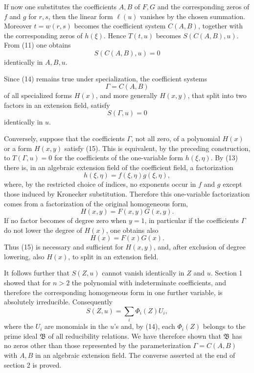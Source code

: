 \documentclass[11pt]{article}
\begin{document}
If now one substitutes the coefficients $A,B$ of $F,G$ and the corresponding zeros of $f$ and $g$ for $r,s$, then the linear form $\ell(u)$ vanishes by the chosen summation. Moreover $t=w(r,s)$ becomes the coefficient system $C(A,B)$, together with the corresponding zeros of $h(\xi)$. Hence $T(t,u)$ becomes $S(C(A,B),u)$. From (11) one obtains
\begin{equation}
  S(C(A,B),u)=0                                                   \tag{14}
\end{equation}
identically in $A,B,u$.

Since (14) remains true under specialization, the coefficient systems
\[
  \Gamma=C(A,B)
\]
of all specialized forms $H(x)$, and more generally $H(x,y)$, that split into two factors in an extension field, satisfy
\begin{equation}
  S(\Gamma,u)=0                                                   \tag{15}
\end{equation}
identically in $u$.

Conversely, suppose that the coefficients $\Gamma$, not all zero, of a polynomial $H(x)$ or a form $H(x,y)$ satisfy (15). This is equivalent, by the preceding construction, to $T(\Gamma,u)=0$ for the coefficients of the one-variable form $h(\xi,\eta)$. By (13) there is, in an algebraic extension field of the coefficient field, a factorization
\[
  h(\xi,\eta)=f(\xi,\eta)g(\xi,\eta),
\]
where, by the restricted choice of indices, no exponents occur in $f$ and $g$ except those induced by Kronecker substitution. Therefore this one-variable factorization comes from a factorization of the original homogeneous form,
\[
  H(x,y)=F(x,y)G(x,y).
\]
If no factor becomes of degree zero when $y=1$, in particular if the coefficients $\Gamma$ do not lower the degree of $H(x)$, one obtains also
\[
  H(x)=F(x)G(x).
\]
Thus (15) is necessary and sufficient for $H(x,y)$, and, after exclusion of degree lowering, also $H(x)$, to split in an extension field.

It follows further that $S(Z,u)$ cannot vanish identically in $Z$ and $u$. Section 1 showed that for $n>2$ the polynomial with indeterminate coefficients, and therefore the corresponding homogeneous form in one further variable, is absolutely irreducible. Consequently
\[
  S(Z,u)=\sum_i \Phi_i(Z)U_i,
\]
where the $U_i$ are monomials in the $u$'s and, by (14), each $\Phi_i(Z)$ belongs to the prime ideal $\mathfrak B$ of all reducibility relations. We have therefore shown that $\mathfrak B$ has no zeros other than those represented by the parameterization $\Gamma=C(A,B)$ with $A,B$ in an algebraic extension field. The converse asserted at the end of section 2 is proved.
\end{document}
